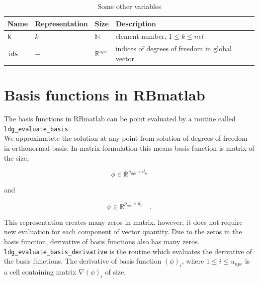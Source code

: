 \documentclass[a4paper]{book}
\begin{document}
\begin{table}
\caption{Some other variables}
\label{table_variable}
\begin{center}
\begin{tabular}{| p{}| p{} |  p{} | p{}|}
\hline
\textbf{Name} & \textbf{Representation} & \textbf{Size} & \textbf{Description}\\
\hline
\verb|k| & $k$ & $\mathbb{N}$ & element number, $1 \leq k \leq nel$\\
\hline
\verb|ids| & $-$ & $\mathbb{R}^{npe}$ & indices of degrees of freedom in global vector\\
\hline
\end{tabular}
\end{center}
\end{table}

\section{Basis functions in RBmatlab}

The basis functions in RBmatlab can be point evaluated by a routine called \verb|ldg_evaluate_basis|.\\

We approximatete the solution at any point from solution of degrees of freedom in orthonormal basis. In matrix formulation this means basis function is matrix of the size,

\begin{equation}\label{basis_func_velocity_rbmatlab}
\phi \in \mathbb{R}^{u_{npe} \times d_u}
\end{equation}

and

\begin{equation}\label{basis_func_pressure_rbmatlab}
\psi \in \mathbb{R}^{p_{npe} \times d_p} \quad \textrm{.}
\end{equation}

This representation creates many zeros in matrix, however, it does not require new evaluation for each component of vector quantity. Due to the zeros in the basis function, derivative of basis functions also has many zeros.\\

\verb|ldg_evaluate_basis_derivative| is the routine which evaluates the derivative of the basis functions. The derivative of basis function $(\phi)_{i}$, where $1 \leq i \leq u_{npe}$ is a cell containing matrix $\nabla (\phi)_{i}$ of size,
\end{document}
